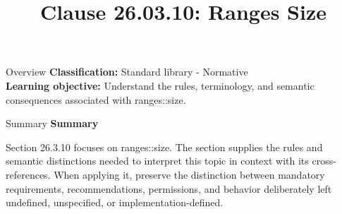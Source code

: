\documentclass[10pt,letterpaper]{article}
\title{Clause 26.03.10: Ranges Size}
\author{}
\date{}
\begin{document}
\maketitle
\begin{CornellOverviewBox}{Overview}
\textbf{Classification:} Standard library - Normative\\[2pt]
\textbf{Learning objective:} Understand the rules, terminology, and semantic consequences associated with ranges::size.
\end{CornellOverviewBox}\begin{CornellSummaryBox}{Summary}
{\sffamily\bfseries\color{Accent} Summary}\par\vspace{3pt}Section 26.3.10 focuses on ranges::size. The section supplies the rules and semantic distinctions needed to interpret this topic in context with its cross-references. When applying it, preserve the distinction between mandatory requirements, recommendations, permissions, and behavior deliberately left undefined, unspecified, or implementation-defined.
\end{CornellSummaryBox}
\end{document}
